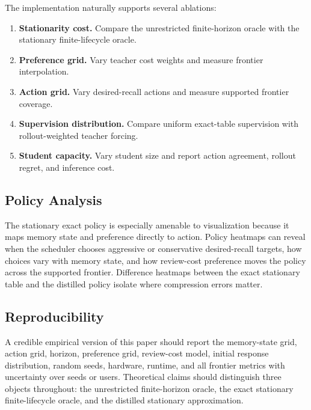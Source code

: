 \documentclass[11pt]{article}
\begin{document}
The implementation naturally supports several ablations:
\begin{enumerate}
    \item \textbf{Stationarity cost.} Compare the unrestricted finite-horizon oracle with the stationary finite-lifecycle oracle.
    \item \textbf{Preference grid.} Vary teacher cost weights and measure frontier interpolation.
    \item \textbf{Action grid.} Vary desired-recall actions and measure supported frontier coverage.
    \item \textbf{Supervision distribution.} Compare uniform exact-table supervision with rollout-weighted teacher forcing.
    \item \textbf{Student capacity.} Vary student size and report action agreement, rollout regret, and inference cost.
\end{enumerate}

\subsection{Policy Analysis}

The stationary exact policy is especially amenable to visualization because it maps memory state and preference directly to action. Policy heatmaps can reveal when the scheduler chooses aggressive or conservative desired-recall targets, how choices vary with memory state, and how review-cost preference moves the policy across the supported frontier. Difference heatmaps between the exact stationary table and the distilled policy isolate where compression errors matter.

\subsection{Reproducibility}

A credible empirical version of this paper should report the memory-state grid, action grid, horizon, preference grid, review-cost model, initial response distribution, random seeds, hardware, runtime, and all frontier metrics with uncertainty over seeds or users. Theoretical claims should distinguish three objects throughout: the unrestricted finite-horizon oracle, the exact stationary finite-lifecycle oracle, and the distilled stationary approximation.



\end{document}
